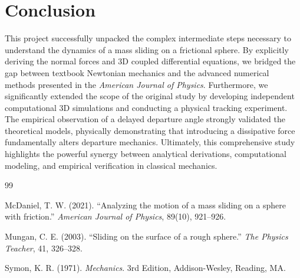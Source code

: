 \documentclass[11pt,letterpaper]{article}
\begin{document}
\section{Conclusion}

This project successfully unpacked the complex intermediate steps necessary to understand the dynamics of a mass sliding on a frictional sphere. By explicitly deriving the normal forces and 3D coupled differential equations, we bridged the gap between textbook Newtonian mechanics and the advanced numerical methods presented in the \textit{American Journal of Physics}. Furthermore, we significantly extended the scope of the original study by developing independent computational 3D simulations and conducting a physical tracking experiment. The empirical observation of a delayed departure angle strongly validated the theoretical models, physically demonstrating that introducing a dissipative force fundamentally alters departure mechanics. Ultimately, this comprehensive study highlights the powerful synergy between analytical derivations, computational modeling, and empirical verification in classical mechanics.

\begin{thebibliography}{99}

McDaniel, T. W. (2021). 
``Analyzing the motion of a mass sliding on a sphere with friction.'' 
\textit{American Journal of Physics}, 89(10), 921--926.

Mungan, C. E. (2003). 
``Sliding on the surface of a rough sphere.'' 
\textit{The Physics Teacher}, 41, 326--328.

Symon, K. R. (1971). 
\textit{Mechanics}. 3rd Edition, Addison-Wesley, Reading, MA.

\end{thebibliography}
\end{document}
